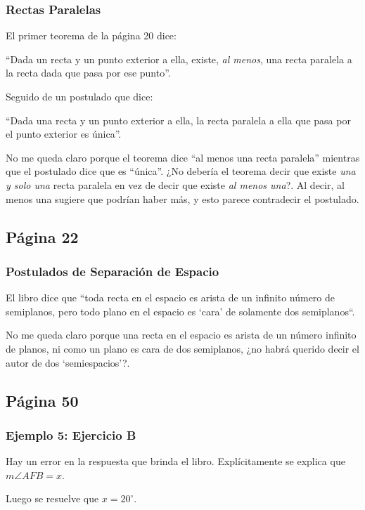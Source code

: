 \subsubsection{Rectas Paralelas}

El primer teorema de la página 20 dice:

    ``Dada un recta y un punto exterior a ella, existe, \emph{al menos}, una recta paralela a la recta dada que pasa por ese punto''.

Seguido de un postulado que dice:

    ``Dada una recta y un punto exterior a ella, la recta paralela a ella que pasa por el punto exterior es única''.

No me queda claro porque el teorema dice ``al menos una recta paralela'' mientras que el postulado dice que es ``única''. ¿No debería el teorema decir que existe \emph{una y solo una} recta paralela en vez de decir que existe \emph{al menos una}?. Al decir, al menos una sugiere que podrían haber más, y esto parece contradecir el postulado.

\subsection{Página 22}
\subsubsection{Postulados de Separación de Espacio}

El libro dice que ``toda recta en el espacio es arista de un infinito número de semiplanos, pero todo plano en el espacio es `cara' de solamente dos semiplanos``.

No me queda claro porque una recta en el espacio es arista de un número infinito de planos, ni como un plano es cara de dos semiplanos, ¿no habrá querido decir el autor de dos `semiespacios'?.

\subsection{Página 50}
\subsubsection{Ejemplo 5: Ejercicio B}

Hay un error en la respuesta que brinda el libro. Explícitamente se explica que \(m\angle{AFB} = x\).

Luego se resuelve que \(x=20^{\circ}\).

